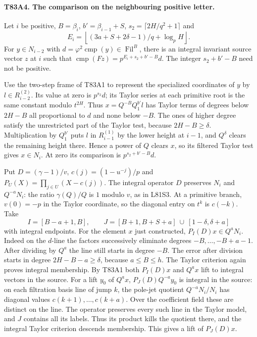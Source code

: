 \paragraph{T83A4. The comparison on the neighbouring positive letter.}
Let $i$ be positive, $B=\beta_i$, $b'=\beta_{i-1}+S$,
$s_2=\lceil2H/q^2+1\rceil$ and
\[
 E_i=\left\lfloor(3a+S+2\delta-1)/q+\log_p H\right\rfloor .
\]
For $y\in N_{i-2}$ with $d=\varphi^2\operatorname{cmp}(y)
\in\operatorname{Fil}^B$, there is an integral invariant
source vector $z$ at $i$ such that
$\operatorname{cmp}(Fz)=p^{E_i+s_2+b'-B}d$.
The integer $s_2+b'-B$ need not be positive.

Use the two-step frame of T83A1 to represent the specialized
coordinates of $y$ by $l\in R_{i-2}^{(2)}$. Its value at zero is
$p^{s_2}d$; its Taylor series at each primitive root is the same
constant modulo $t^{2H}$. Thus
$x=Q^{-B}Q_1^{b'}l$ has Taylor terms of degrees below $2H-B$
all proportional to $d$ and none below $-B$. The ones of higher
degree satisfy the unrestricted part of the Taylor test, because
$2H-B\ge\delta$. Multiplication by $Q_1^{b'}$ puts $l$ in
$R_{i-1}^{(1)}$ by the lower height at $i-1$, and $Q^\delta$
clears the remaining height there. Hence a power of $Q$ clears
$x$, so its filtered Taylor test gives $x\in N_i$. At zero its
comparison is $p^{s_2+b'-B}d$.

Put $D=(\gamma-1)/v$, $c(j)=(1-u^{-j})/p$ and
$P_U(X)=\prod_{j\in U}(X-c(j))$. The integral operator $D$
preserves $N_i$ and $Q^{-a}N_i$: the ratio $\gamma(Q)/Q$ is
$1$ modulo $v$, as in L81S3. At a primitive branch, $v(0)=-p$
in the Taylor coordinate, so the diagonal entry on $t^k$ is
$c(-k)$. Take
\[
 I=[B-a+1,B],\qquad
 J=[B+1,B+S+a]\ \cup\ [1-\delta,\delta+a]
\]
with integral endpoints. For the element $x$ just constructed,
$P_I(D)x\in Q^aN_i$. Indeed on the $d$-line the factors successively
eliminate degrees $-B,\ldots,-B+a-1$. After dividing by $Q^a$ the
line still starts in degree $-B$. The error after division starts
in degree $2H-B-a\ge\delta$, because $a\le B\le h$.
The Taylor criterion again proves integral membership. By T83A1
both $P_I(D)x$ and $Q^a x$ lift to integral vectors in the
source. For a lift $y_0$ of $Q^a x$, $P_J(D)Q^{-a}y_0$ is
integral in the source: on each filtration basis line of jump $k$,
the pole-jet quotient $Q^{-a}N_i/N_i$ has diagonal values
$c(k+1),\ldots,c(k+a)$. Over the coefficient field these are
distinct on the line. The operator preserves every such line in the
Taylor model, and $J$ contains all its labels. Thus its product
kills the quotient there, and the integral Taylor criterion descends
membership. This gives a lift of $P_J(D)x$.

